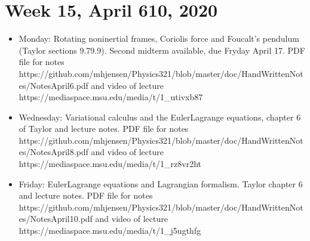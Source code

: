 \documentclass[letterpaper,10pt,english]{sphinxmanual}
\begin{document}
\section{Week 15, April  6\sphinxhyphen{}10, 2020}
\label{\detokenize{intro:week-15-april-6-10-2020}}\begin{itemize}
\item {} 
Monday: Rotating non\sphinxhyphen{}inertial frames, Coriolis force and Foucalt’s pendulum (Taylor sections 9.7\sphinxhyphen{}9.9). Second midterm available, due Fryday April 17.  PDF file for notes https://github.com/mhjensen/Physics321/blob/master/doc/HandWrittenNotes/NotesApril6.pdf and video of lecture https://mediaspace.msu.edu/media/t/1\_utivxb87

\item {} 
Wednesday: Variational calculus and the Euler\sphinxhyphen{}Lagrange equations, chapter 6 of Taylor and lecture notes. PDF file for notes https://github.com/mhjensen/Physics321/blob/master/doc/HandWrittenNotes/NotesApril8.pdf and video of lecture https://mediaspace.msu.edu/media/t/1\_rz8vr2ht

\item {} 
Friday: Euler\sphinxhyphen{}Lagrange equations and Lagrangian formalism. Taylor chapter 6 and lecture notes. PDF file for notes https://github.com/mhjensen/Physics321/blob/master/doc/HandWrittenNotes/NotesApril10.pdf and video of lecture https://mediaspace.msu.edu/media/t/1\_j5ugthfg

\end{itemize}
\end{document}
